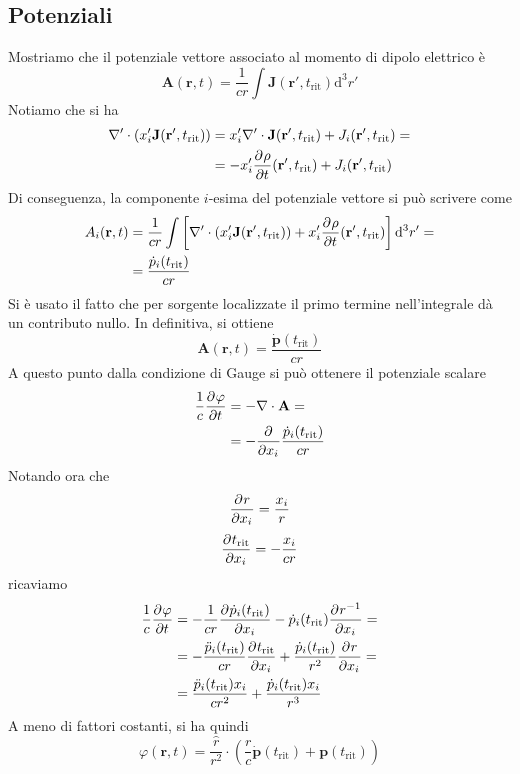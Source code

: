 \documentclass[a4paper,11pt]{article}
\renewcommand{\d}{\mathrm{d}}
\renewcommand{\vec}[1]{\mathbf{#1}}
\renewcommand{\t}{t_{\mathrm{rit}}}
\begin{document}
\subsection{Potenziali}
Mostriamo che il potenziale vettore associato al momento di dipolo elettrico è
\[\vec{A}(\vec{r},t)=\frac{1}{cr}\int\vec{J}(\vec{r}',\t)\d^3r'\]
Notiamo che si ha
\begin{align*}\nabla'\cdot\left(x_i'\vec{J}(\vec{r}',\t)\right)&=x_i'\nabla'\cdot\vec{J}(\vec{r}',\t)+J_i(\vec{r}',\t)=\\&=-x_i'\pder{\rho}{t}(\vec{r}',\t)+J_i(\vec{r}',\t)\end{align*}
Di conseguenza, la componente $i$-esima del potenziale vettore si può scrivere come
\begin{align*}A_{i}(\vec{r},t)&=\frac{1}{cr}\int\left[\nabla'\cdot\left(x_i'\vec{J}(\vec{r}',\t)\right)+x_i'\pder{\rho}{t}(\vec{r}',\t)\right]\d^3r'=\\&=\frac{\dot{p}_i(\t)}{cr}\end{align*}
Si è usato il fatto che per sorgente localizzate il primo termine nell'integrale dà un contributo nullo. In definitiva, si ottiene
\[\vec{A}(\vec{r},t)=\frac{\dot{\vec{p}}(\t)}{cr}\]
A questo punto dalla condizione di Gauge si può ottenere il potenziale scalare
\begin{align*}\frac{1}{c}\pder{\varphi}{t}&=-\nabla\cdot\vec{A}=\\&=-\pder{}{x_i}\frac{\dot{p}_i(\t)}{cr}\end{align*}
Notando ora che
\[\dfrac{\partial ^{}r}{\partial {x_i}^{}}=\frac{x_i}{r}\]
\[\pder{\t}{x_i}=-\frac{x_i}{cr}\]
ricaviamo
\begin{align*}\frac{1}{c}\pder{\varphi}{t}&=-\frac{1}{cr}\pder{\dot{p}_i(\t)}{x_i}-\dot{p}_i(\t)\pder{r^{-1}}{x_i}=\\&=-\frac{\ddot{p}_i(\t)}{cr}\pder{\t}{x_i}+\frac{\dot{p}_i(\t)}{r^2}\pder{r}{x_i}=\\&=\frac{\ddot{p}_i(\t)x_i}{cr^2}+\frac{\dot{p}_i(\t)x_i}{r^3}\end{align*}
A meno di fattori costanti, si ha quindi
\[\varphi(\vec{r},t)=\frac{\hat{r}}{r^2}\cdot\left(\frac{r}{c}\dot{\vec{p}}(\t)+\vec{p}(\t)\right)\]
\end{document}
